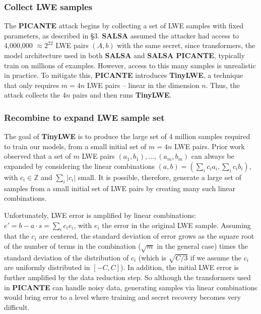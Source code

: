 \documentclass{article}
\begin{document}
\subsubsection{Collect LWE samples}
The \textbf{PICANTE} attack begins by collecting a set of LWE samples with fixed parameters, as described in \S3. \textbf{SALSA} assumed the attacker had access to 4,000,000 $\approx 2^{22}$ LWE pairs $(A, b)$ with the same secret, since transformers, the model architecture used in both \textbf{SALSA} and \textbf{SALSA PICANTE}, typically train on millions of examples. However, access to this many samples is unrealistic in practice. To mitigate this, \textbf{PICANTE} introduces \textbf{TinyLWE}, a technique that only requires $m = 4n$ LWE pairs – linear in the dimension $n$. Thus, the attack collects the $4n$ pairs and then runs \textbf{TinyLWE}.

\subsubsection{Recombine to expand LWE sample set}
The goal of \textbf{TinyLWE} is to produce the large set of 4 million samples required to train our models, from a small initial set of $m = 4n$ LWE pairs. Prior work \cite{5,51} observed that a set of $m$ LWE pairs $(a_1, b_1), \ldots, (a_m, b_m)$ can always be expanded by considering the linear combinations $(a, b) = (\sum_i c_i a_i, \sum_i c_i b_i)$, with $c_i \in \mathbb{Z}$ and $\sum_i |c_i|$ small. It is possible, therefore, generate a large set of samples from a small initial set of LWE pairs by creating many such linear combinations.

Unfortunately, LWE error is amplified by linear combinations: $e' = b - a \cdot s = \sum_i c_i e_i$, with $e_i$ the error in the original LWE sample. Assuming that the $c_i$ are centered, the standard deviation of error grows as the square root of the number of terms in the combination ($\sqrt{m}$ in the general case) times the standard deviation of the distribution of $c_i$ (which is $\sqrt{C/3}$ if we assume the $c_i$ are uniformly distributed in $[-C, C]$). In addition, the initial LWE error is further amplified by the data reduction step. So although the transformers used in \textbf{PICANTE} can handle noisy data, generating samples via linear combinations would bring error to a level where training and secret recovery becomes very difficult.
\end{document}
